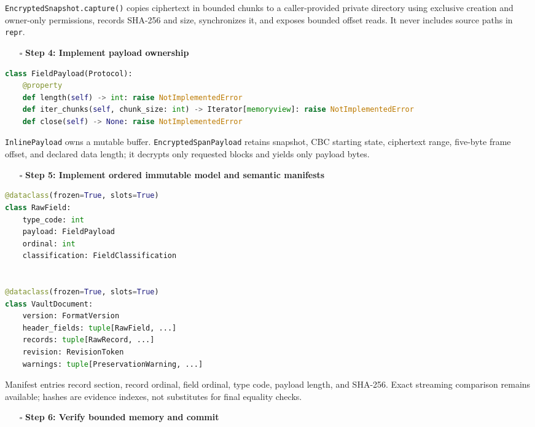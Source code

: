 \documentclass[
  letterpaper,
]{article}
\newcommand{\passthrough}[1]{#1}
\providecommand{\tightlist}{%
  \setlength{\itemsep}{0pt}\setlength{\parskip}{0pt}}
\begin{document}
\nolinkurl{EncryptedSnapshot.capture()} copies ciphertext in bounded chunks to a caller-provided private directory using
exclusive creation and owner-only permissions, records SHA-256 and size, synchronizes it, and exposes bounded offset
reads. It never includes source paths in \passthrough{\lstinline!repr!}.

\begin{itemize}
\tightlist
\item[$\square$]
  \textbf{Step 4: Implement payload ownership}
\end{itemize}

\begin{lstlisting}[language=Python]
class FieldPayload(Protocol):
    @property
    def length(self) -> int: raise NotImplementedError
    def iter_chunks(self, chunk_size: int) -> Iterator[memoryview]: raise NotImplementedError
    def close(self) -> None: raise NotImplementedError
\end{lstlisting}

\nolinkurl{InlinePayload} owns a mutable buffer. \nolinkurl{EncryptedSpanPayload} retains snapshot, CBC starting state,
ciphertext range, five-byte frame offset, and declared data length; it decrypts only requested blocks and yields only
payload bytes.

\begin{itemize}
\tightlist
\item[$\square$]
  \textbf{Step 5: Implement ordered immutable model and semantic manifests}
\end{itemize}

\begin{lstlisting}[language=Python]
@dataclass(frozen=True, slots=True)
class RawField:
    type_code: int
    payload: FieldPayload
    ordinal: int
    classification: FieldClassification


@dataclass(frozen=True, slots=True)
class VaultDocument:
    version: FormatVersion
    header_fields: tuple[RawField, ...]
    records: tuple[RawRecord, ...]
    revision: RevisionToken
    warnings: tuple[PreservationWarning, ...]
\end{lstlisting}

Manifest entries record section, record ordinal, field ordinal, type code, payload length, and SHA-256. Exact streaming
comparison remains available; hashes are evidence indexes, not substitutes for final equality checks.

\begin{itemize}
\tightlist
\item[$\square$]
  \textbf{Step 6: Verify bounded memory and commit}
\end{itemize}
\end{document}
